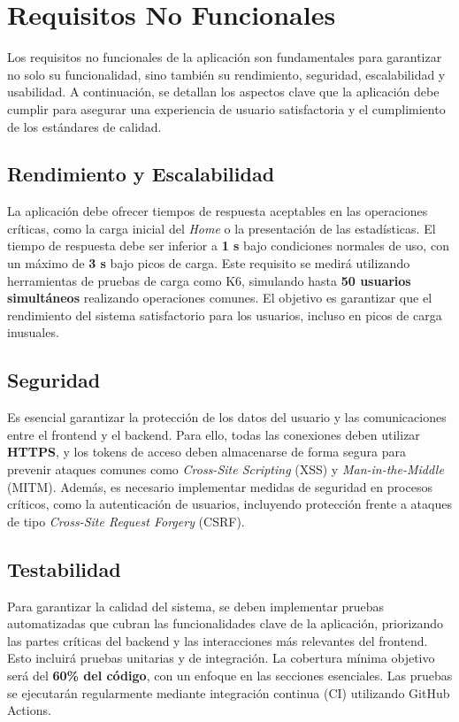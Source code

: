 \section{Requisitos No Funcionales}

Los requisitos no funcionales de la aplicación son fundamentales para garantizar no solo su funcionalidad, sino también su rendimiento, seguridad, escalabilidad y usabilidad. A continuación, se detallan los aspectos clave que la aplicación debe cumplir para asegurar una experiencia de usuario satisfactoria y el cumplimiento de los estándares de calidad.

\subsection*{Rendimiento y Escalabilidad}

La aplicación debe ofrecer tiempos de respuesta aceptables en las operaciones críticas, como la carga inicial del \textit{Home} o la presentación de las estadísticas. El tiempo de respuesta debe ser inferior a \textbf{1 s} bajo condiciones normales de uso, con un máximo de \textbf{3 s} bajo picos de carga. Este requisito se medirá utilizando herramientas de pruebas de carga como K6, simulando hasta \textbf{50 usuarios simultáneos} realizando operaciones comunes. El objetivo es garantizar que el rendimiento del sistema satisfactorio para los usuarios, incluso en picos de carga inusuales.

\subsection*{Seguridad}

Es esencial garantizar la protección de los datos del usuario y las comunicaciones entre el frontend y el backend. Para ello, todas las conexiones deben utilizar \textbf{HTTPS}, y los tokens de acceso deben almacenarse de forma segura para prevenir ataques comunes como \textit{Cross-Site Scripting} (XSS) y \textit{Man-in-the-Middle} (MITM). Además, es necesario implementar medidas de seguridad en procesos críticos, como la autenticación de usuarios, incluyendo protección frente a ataques de tipo \textit{Cross-Site Request Forgery} (CSRF).

\subsection*{Testabilidad}

Para garantizar la calidad del sistema, se deben implementar pruebas automatizadas que cubran las funcionalidades clave de la aplicación, priorizando las partes críticas del backend y las interacciones más relevantes del frontend. Esto incluirá pruebas unitarias y de integración. La cobertura mínima objetivo será del \textbf{60\% del código}, con un enfoque en las secciones esenciales. Las pruebas se ejecutarán regularmente mediante integración continua (CI) utilizando GitHub Actions.


